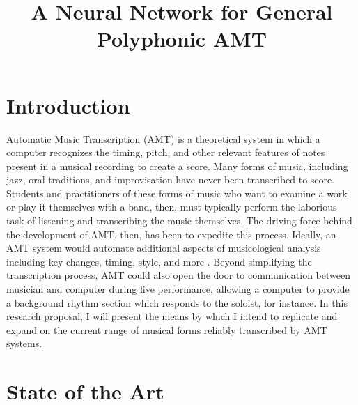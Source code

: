 \documentclass[conference]{IEEEtran}
\begin{document}
\title{A Neural Network for General Polyphonic AMT\\
}

\author{
}

\maketitle

\section{Introduction}

Automatic Music Transcription (AMT) is a theoretical system in which a computer recognizes the timing, pitch, and other relevant features of notes present in a musical recording to create a score. Many forms of music, including jazz, oral traditions, and  improvisation have never been transcribed to score. Students and practitioners of these forms of music who want to examine a work or play it themselves with a band, then, must typically perform the laborious task of listening and transcribing the music themselves. The driving force behind the development of AMT, then, has been to expedite this process. Ideally, an AMT system would automate additional aspects of musicological analysis including key changes, timing, style, and more \cite{benetos}. Beyond simplifying the transcription process, AMT could also open the door to communication between musician and computer during live performance, allowing a computer to provide a background rhythm section which responds to the soloist, for instance. In this research proposal, I will present the means by which I intend to replicate and expand on the current range of musical forms reliably transcribed by AMT systems.

\section{State of the Art}
\end{document}
